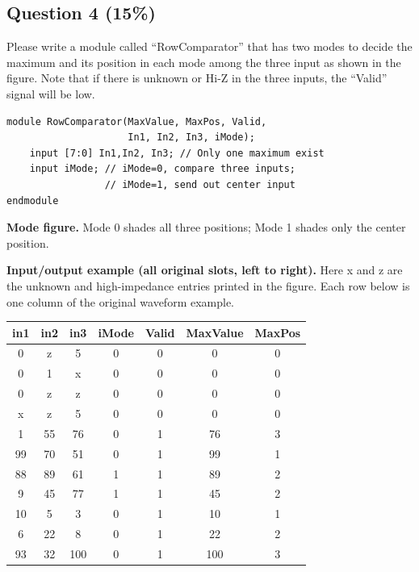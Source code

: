\documentclass[11pt,a4paper]{article}
\newcommand{\question}[2]{\subsection*{Question #1 \hfill (#2\%)}}
\begin{document}
\question{4}{15}
Please write a module called ``RowComparator'' that has two modes to
decide the maximum and its position in each mode among the three input
as shown in the figure. Note that if there is unknown or Hi-Z in the
three inputs, the ``Valid'' signal will be low.
\begin{verbatim}
module RowComparator(MaxValue, MaxPos, Valid,
                     In1, In2, In3, iMode);
    input [7:0] In1,In2, In3; // Only one maximum exist
    input iMode; // iMode=0, compare three inputs;
                 // iMode=1, send out center input
endmodule
\end{verbatim}
\textbf{Mode figure.} Mode 0 shades all three positions; Mode 1 shades
only the center position.
\begin{center}
\end{center}
\textbf{Input/output example (all original slots, left to right).}
Here x and z are the unknown and high-impedance entries printed in the
figure. Each row below is one column of the original waveform example.
\begin{center}
\begin{tabular}{ccc|c|ccc}\toprule
in1 & in2 & in3 & iMode & Valid & MaxValue & MaxPos\\\midrule
0 & z & 5 & 0 & 0 & 0 & 0\\
0 & 1 & x & 0 & 0 & 0 & 0\\
0 & z & z & 0 & 0 & 0 & 0\\
x & z & 5 & 0 & 0 & 0 & 0\\
1 & 55 & 76 & 0 & 1 & 76 & 3\\
99 & 70 & 51 & 0 & 1 & 99 & 1\\
88 & 89 & 61 & 1 & 1 & 89 & 2\\
9 & 45 & 77 & 1 & 1 & 45 & 2\\
10 & 5 & 3 & 0 & 1 & 10 & 1\\
6 & 22 & 8 & 0 & 1 & 22 & 2\\
93 & 32 & 100 & 0 & 1 & 100 & 3\\\bottomrule
\end{tabular}
\end{center}
\end{document}
